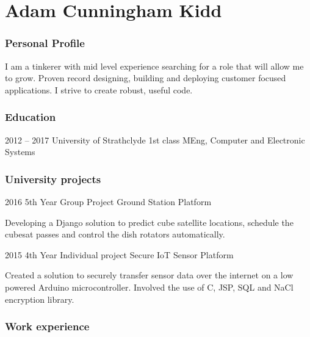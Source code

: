 \documentclass{tccv}
\begin{document}
\part{Adam Cunningham Kidd }

\section{Personal Profile}
I am a tinkerer with mid level experience searching for a role that will allow me to grow. Proven record designing, building and deploying customer focused applications. I strive to create robust, useful code.

\section{Education}


\begin{nuni}

\item{2012 -- 2017}
     {University of Strathclyde}
     {1st class MEng, Computer and Electronic Systems}
\end{nuni}

\section{University projects}

\begin{yearlist}

\item{2016}
     {5th Year Group Project}
     {Ground Station Platform}
\end{yearlist}

Developing a Django solution to predict cube satellite locations, schedule the cubesat passes and control the dish rotators automatically. 
\\ 

\begin{yearlist}
\item{2015}
     {4th Year Individual project}
     {Secure IoT Sensor Platform}
\end{yearlist}

Created a solution to securely transfer sensor data over the internet on a low powered Arduino microcontroller. Involved the use of C, JSP, SQL and NaCl encryption library.

\section{Work experience}
\end{document}
